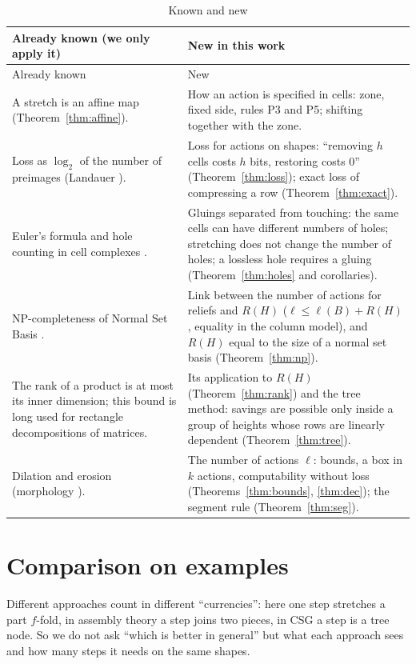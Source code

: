 \documentclass[11pt,a4paper]{article}
\theoremstyle{plain}
\theoremstyle{definition}
\theoremstyle{remark}
\begin{document}
\begin{longtable}{p{}p{}}
\caption{Known and new}\label{tab:new}\\
\toprule
Already known (we only apply it) & New in this work\\
\midrule
\endfirsthead
\toprule Already known & New\\ \midrule \endhead
A stretch is an affine map (Theorem~\ref{thm:affine}). &
How an action is specified in cells: zone, fixed side, rules P3 and P5; shifting together with the zone.\\
Loss as $\log_2$ of the number of preimages (Landauer \cite{landauer}). &
Loss for actions on shapes: ``removing $h$ cells costs $h$ bits, restoring costs 0'' (Theorem~\ref{thm:loss}); exact loss of compressing a row (Theorem~\ref{thm:exact}).\\
Euler's formula and hole counting in cell complexes \cite{kaczynski}. &
Gluings separated from touching: the same cells can have different numbers of holes; stretching does not change the number of holes; a lossless hole requires a gluing (Theorem~\ref{thm:holes} and corollaries).\\
NP-completeness of Normal Set Basis \cite{jiang}. &
Link between the number of actions for reliefs and $R(H)$ ($\ell\le\ell(B)+R(H)$, equality in the column model), and $R(H)$ equal to the size of a normal set basis (Theorem~\ref{thm:np}).\\
The rank of a product is at most its inner dimension; this bound is long used for rectangle decompositions of matrices. &
Its application to $R(H)$ (Theorem~\ref{thm:rank}) and the tree method: savings are possible only inside a group of heights whose rows are linearly dependent (Theorem~\ref{thm:tree}).\\
Dilation and erosion (morphology \cite{serra}). &
The number of actions $\ell$: bounds, a box in $k$ actions, computability without loss (Theorems~\ref{thm:bounds}, \ref{thm:dec}); the segment rule (Theorem~\ref{thm:seg}).\\
\bottomrule
\end{longtable}

\section{Comparison on examples}\label{sec:cmp}

Different approaches count in different ``currencies'': here one step stretches a part $f$-fold, in assembly theory a step joins two pieces, in CSG a step is a tree node. So we do not ask ``which is better in general'' but what each approach sees and how many steps it needs on the same shapes.
\end{document}

